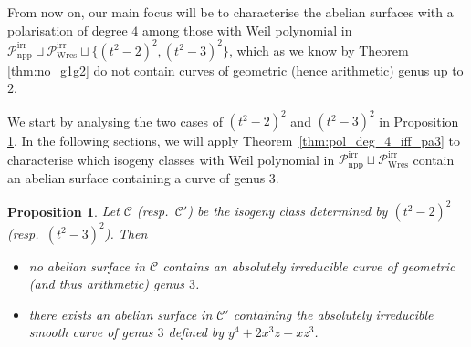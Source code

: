 \documentclass[11pt]{amsart}
\newcommand\cC{\mathcal{C}}
\theoremstyle{plain}
\newtheorem{proposition}[theorem]{Proposition}
\theoremstyle{definition}
\newcommand\PirrA{\mathcal{P}^\mathrm{irr}_\mathrm{npp}}
\newcommand\PirrB{\mathcal{P}^\mathrm{irr}_\mathrm{Wres}}
\begin{document}
From now on, our main focus will be to characterise the abelian surfaces with a polarisation of degree $4$ among those with Weil polynomial in $\PirrA\sqcup\PirrB \sqcup  \{ (t^2-2)^2 , (t^2-3)^2 \}$, which as we know by Theorem \ref{thm:no_g1g2} do not contain curves of geometric (hence arithmetic) genus up to $2$.

We start by analysing the two cases of $(t^2-2)^2 $ and $(t^2-3)^2$ in Proposition \ref{prop:q2q3}.
In the following sections, we will apply Theorem~\ref{thm:pol_deg_4_iff_pa3} to characterise which isogeny classes with Weil polynomial in $\PirrA\sqcup\PirrB$ contain an abelian surface containing a curve of genus $3$.

\begin{proposition}\label{prop:q2q3}
    Let $\cC$ (resp.~$\cC'$) be the isogeny class determined by $(t^2-2)^2$ (resp.~$(t^2-3)^2$).
    Then 
    \begin{itemize}
        \item no abelian surface in $\cC$ contains an absolutely irreducible curve of geometric (and thus arithmetic) genus $3$.
        \item there exists an abelian surface in $\cC'$ containing the absolutely irreducible smooth curve of genus $3$ defined by $y^4+2x^3z+xz^3$.
    \end{itemize}
\end{proposition}
\end{document}
